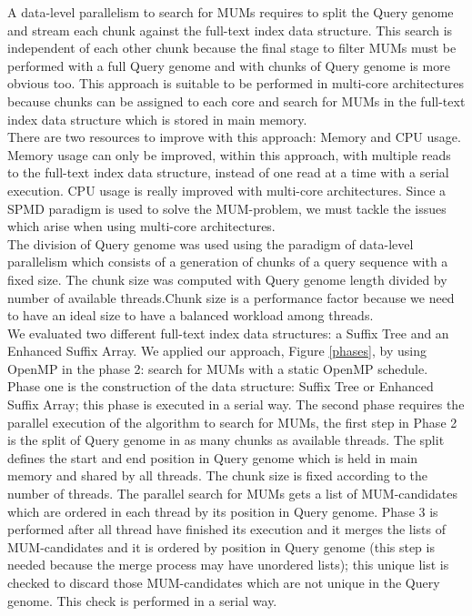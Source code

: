 \documentclass{acm_proc_article-sp}
\begin{document}
A data-level parallelism to search for MUMs requires to split the Query genome and stream each chunk against the full-text index data structure. This search is independent of each other chunk because the final stage to filter MUMs must be performed with a full Query genome and with chunks of Query genome is more obvious too. This approach is suitable to be performed in multi-core architectures because chunks can be assigned to each core and search for MUMs in the full-text index data structure which is stored in main memory.\\
There are two resources to improve with this approach: Memory and CPU usage. Memory usage can only be improved, within this approach, with multiple reads to the full-text index data structure, instead of one read at a time with a serial execution. CPU usage is really improved with multi-core architectures. Since a SPMD paradigm is used to solve the MUM-problem, we must tackle the issues which arise when using multi-core architectures.\\
The division of Query genome  was used using the paradigm of data-level parallelism which consists of a generation of chunks of a query sequence with a fixed size. The chunk size was computed with Query genome length divided by number of available threads.Chunk size is a performance factor because we need to have an ideal size to have a balanced workload among threads.\\
We evaluated two different full-text index data structures: a Suffix Tree and an Enhanced Suffix Array. We applied our approach, Figure \ref{phases}, by using OpenMP in the phase 2: search for MUMs with a static OpenMP schedule.\\
Phase one is the construction of the data structure: Suffix Tree or Enhanced Suffix Array; this phase is executed in a serial way. The second phase requires the parallel execution of the algorithm to search for MUMs, the first step in Phase 2 is the split of Query genome in as many chunks as available threads. The split defines the start and end position in Query genome which is held in main memory and shared by all threads. The chunk size is fixed according to the number of threads. The parallel search for MUMs gets a list of MUM-candidates which are ordered in each thread by its position in Query genome. Phase 3 is performed after all thread have finished its execution and it merges the lists of MUM-candidates and it is ordered by position in Query genome (this step is needed because the merge process may have unordered lists); this unique list is checked to discard those MUM-candidates which are not unique in the Query genome. This check is performed in a serial way.
\end{document}
